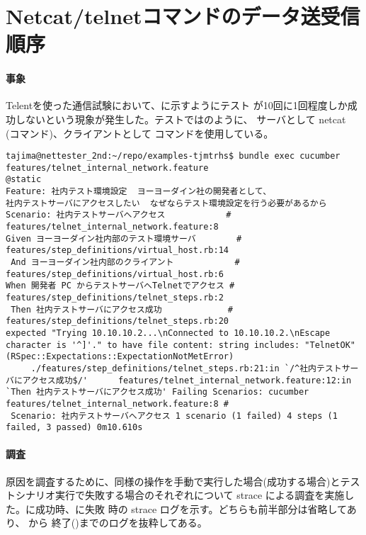  \section{Netcat/telnetコマンドのデータ送受信順序}
 \label{sec:telnet-probrem}

    \paragraph{事象}
Telentを使った通信試験において、に示すようにテスト
が10回に1回程度しか成功しないという現象が発生した。テストではのように、
サーバとして netcat (コマンド)、クライアントとして
 コマンドを使用している。
 
\begin{lstlisting}[caption=Telnetテストシナリオ,label=lst:telnet-bk]
tajima@nettester_2nd:~/repo/examples-tjmtrhs$ bundle exec cucumber features/telnet_internal_network.feature
@static
Feature: 社内テスト環境設定  ヨーヨーダイン社の開発者として、
社内テストサーバにアクセスしたい  なぜならテスト環境設定を行う必要があるから
Scenario: 社内テストサーバへアクセス            # features/telnet_internal_network.feature:8
Given ヨーヨーダイン社内部のテスト環境サーバ        # features/step_definitions/virtual_host.rb:14
 And ヨーヨーダイン社内部のクライアント            # features/step_definitions/virtual_host.rb:6
When 開発者 PC からテストサーバへTelnetでアクセス # features/step_definitions/telnet_steps.rb:2
 Then 社内テストサーバにアクセス成功             # features/step_definitions/telnet_steps.rb:20
expected "Trying 10.10.10.2...\nConnected to 10.10.10.2.\nEscape character is '^]'." to have file content: string includes: "TelnetOK" (RSpec::Expectations::ExpectationNotMetError)
     ./features/step_definitions/telnet_steps.rb:21:in `/^社内テストサーバにアクセス成功$/'      features/telnet_internal_network.feature:12:in `Then 社内テストサーバにアクセス成功' Failing Scenarios: cucumber features/telnet_internal_network.feature:8 #
 Scenario: 社内テストサーバへアクセス 1 scenario (1 failed) 4 steps (1 failed, 3 passed) 0m10.610s
\end{lstlisting}

    \paragraph{調査}

原因を調査するために、同様の操作を手動で実行した場合(成功する場合)とテス
トシナリオ実行で失敗する場合のそれぞれについて strace による調査を実施し
た。に成功時、に失敗
時の strace ログを示す。どちらも前半部分は省略してあり、
から 終了()までのログを抜粋してある。

